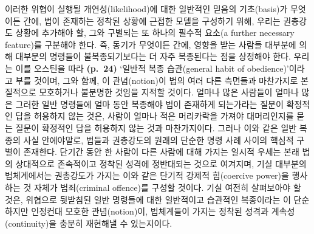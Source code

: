 이러한 위협이 실행될 개연성(likelihood)에 대한 일반적인 믿음의
기초(basis)가 무엇이든 간에, 법이 존재하는 정착된 상황에 근접한 모델을
구성하기 위해, 우리는 권총강도 상황에 추가해야 할, 그와 구별되는 또
하나의 필수적 요소(a further necessary feature)를 구분해야 한다. 즉,
동기가 무엇이든 간에, 영향을 받는 사람들 대부분에 의해 대부분의 명령들이
불복종되기보다는 더 자주 복종된다는 점을 상정해야 한다. 우리는 이를
오스틴을 따라 \textbf{(p.~24)} ‘일반적 복종 습관(general habit of
obedience)’이라고 부를 것이며, 그와 함께, 이 관념(notion)이 법의 여러
다른 측면들과 마찬가지로 본질적으로 모호하거나 불분명한 것임을 지적할
것이다. 얼마나 많은 사람들이 얼마나 많은 그러한 일반 명령들에 얼마 동안
복종해야 법이 존재하게 되는가라는 질문이 확정적인 답을 허용하지 않는
것은, 사람이 얼마나 적은 머리카락을 가져야 대머리인지를 묻는 질문이
확정적인 답을 허용하지 않는 것과 마찬가지이다. 그러나 이와 같은 일반
복종의 사실 안에야말로, 법들과 권총강도의 원래의 단순한 명령 사례 사이의
핵심적 구별이 존재한다. 단기간 동안 한 사람이 다른 사람에 대해 가지는
일시적 우세는 본래 법의 상대적으로 존속적이고 정착된 성격에 정반대되는
것으로 여겨지며, 기실 대부분의 법체계에서는 권총강도가 가지는 이와 같은
단기적 강제적 힘(coercive power)을 행사하는 것 자체가 범죄(criminal
offence)를 구성할 것이다. 기실 여전히 살펴보아야 할 것은, 위협으로
뒷받침된 일반 명령들에 대한 일반적이고 습관적인 복종이라는 이 단순하지만
인정컨대 모호한 관념(notion)이, 법체계들이 가지는 정착된 성격과
계속성(continuity)을 충분히 재현해낼 수 있는지이다.


